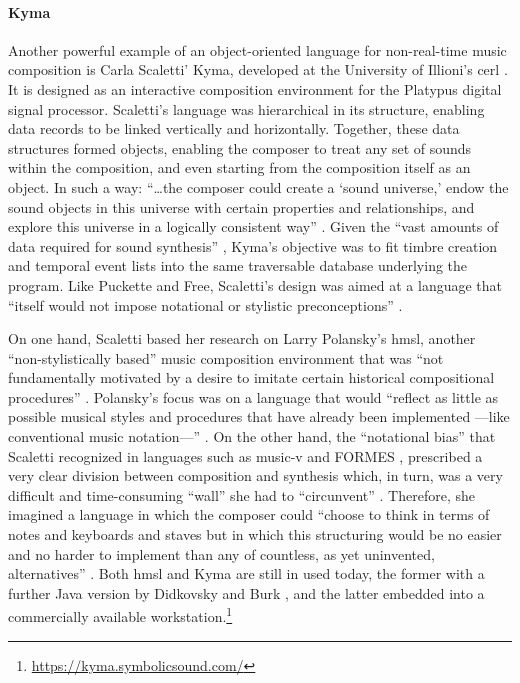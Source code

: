 	
	\paragraph{Kyma}
	\label{computer:kyma}

	Another powerful example of an object-oriented language for non-real-time music composition is Carla Scaletti' Kyma, developed at the University of Illioni's \gls{cerl} \parencite{DBLP:conf/icmc/Scaletti87}. It is designed as an interactive composition environment for the Platypus digital signal processor. Scaletti's language was hierarchical in its structure, enabling data records to be linked vertically and horizontally. Together, these data structures formed objects, enabling the composer to treat any set of sounds within the composition, and even starting from the composition itself as an object. In such a way: ``\dots the composer could create a `sound universe,' endow the sound objects in this universe with certain properties and relationships, and explore this universe in a logically consistent way'' \parencite[50]{DBLP:conf/icmc/Scaletti87}. Given the ``vast amounts of data required for sound synthesis'' \parencite[50]{DBLP:conf/icmc/Scaletti87}, Kyma's objective was to fit timbre creation and temporal event lists into the same traversable database underlying the program. Like Puckette and Free, Scaletti's design was aimed at a language that ``itself would not impose notational or stylistic preconceptions'' \parencite[50]{DBLP:conf/icmc/Scaletti87}.

	On one hand, Scaletti based her research on Larry Polansky's \gls{hmsl}, another ``non-stylistically based'' music composition environment that was ``not fundamentally motivated by a desire to imitate certain historical compositional procedures'' \parencite[224]{DBLP:conf/icmc/RosenboomP85}. Polansky's focus was on a language that would ``reflect as little as possible musical styles and procedures that have already been implemented ---like conventional music notation---'' \parencite[224]{DBLP:conf/icmc/RosenboomP85}. On the other hand, the ``notational bias'' \parencite[49]{DBLP:conf/icmc/Scaletti87} that Scaletti recognized in languages such as \gls{music-v} and FORMES \parencite{DBLP:conf/icmc/RodetBCP82, DBLP:conf/icmc/BoyntonDPR86}, prescribed a very clear division between composition and synthesis which, in turn, was a very difficult and time-consuming ``wall'' she had to ``circunvent'' \parencite[49]{DBLP:conf/icmc/Scaletti87}. Therefore, she imagined a language in which the composer could ``choose to think in terms of notes and keyboards and staves but in which this structuring would be no easier and no harder to implement than any of countless, as yet uninvented, alternatives'' \parencite[49]{DBLP:conf/icmc/Scaletti87}. Both \gls{hmsl} and Kyma are still in used today, the former with a further Java version by Didkovsky and Burk \parencite{DBLP:conf/icmc/DidkovskyB01}, and the latter embedded into a commercially available workstation.\footnote{\url{https://kyma.symbolicsound.com/}}

